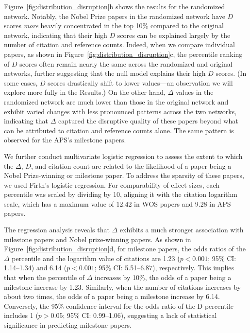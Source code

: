 \documentclass[12pt]{article}
\begin{document}
Figure~\ref{fig:distribution_disruption}b shows the results for the randomized network. Notably, the Nobel Prize papers in the randomized network have $D$ scores \emph{more} heavily concentrated in the top 10\% compared to the original network, indicating that their high $D$ scores can be explained largely by the number of citation and reference counts. Indeed, when we compare individual papers, as shown in Figure~\ref{fig:distribution_disruption}c, the percentile ranking of $D$ scores often remain nearly the same across the randomized and original networks, further suggesting that the null model explains their high $D$ scores. (In some cases, $D$ scores drastically shift to lower values---an observation we will explore more fully in the Results.) On the other hand, $\Delta$ values in the randomized network are much lower than those in the original network and exhibit varied changes with less pronounced patterns across the two networks, indicating that  $\Delta$ captured the disruptive quality of these papers beyond what can be attributed to citation and reference counts alone. The same pattern is observed for the APS’s milestone papers.


We further conduct multivariate logistic regression to assess the extent to which the $\Delta$, $D$, and citation count are related to the likelihood of a paper being a Nobel Prize-winning or milestone paper. To address the sparsity of these papers, we used Firth's logistic regression. For comparability of effect sizes, each percentile was scaled by dividing by 10, aligning it with the citation logarithm scale, which has a maximum value of 12.42 in WOS papers and 9.28 in APS papers.

The regression analysis reveals that $\Delta$ exhibits a much stronger association with milestone papers and Nobel prize-winning papers. As shown in Figure~\ref{fig:distribution_disruption}d, for milestone papers, the odds ratios of the $\Delta$ percentile and the logarithm value of citations are 1.23 ($p<0.001$; 95\% CI: 1.14--1.34) and 6.14 ($p<0.001$; 95\% CI: 5.51--6.87), respectively. This implies that when the percentile of $\Delta$ increases by 10\%, the odds of a paper being a milestone increase by 1.23. Similarly, when the number of citations increases by about two times, the odds of a paper being a milestone increase by 6.14. Conversely, the 95\% confidence interval for the odds ratio of the D percentile includes 1 ($p>0.05$; 95\% CI: 0.99--1.06), suggesting a lack of statistical significance in predicting milestone papers.
\end{document}
